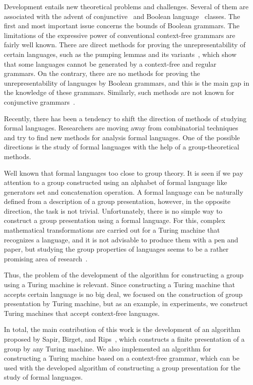 \documentclass[conference]{IEEEtran}
\theoremstyle{definition}
\begin{document}
Development entails new theoretical problems and challenges.
Several of them are associated with the advent of conjunctive~\cite{ConjGrammars} and Boolean language~\cite{BoolGrammars} classes.
The first and most important issue concerns the bounds of Boolean grammars.
The limitations of the expressive power of conventional context-free grammars are fairly well known. There are direct methods for proving the unrepresentability of certain languages,
such as the pumping lemmas and its variants~\cite{pumpingLemma}, which show that some languages
cannot be generated by a context-free and regular grammars. On the contrary, there are no methods
for proving the unrepresentability of languages by Boolean grammars, and this
is the main gap in the knowledge of these grammars. Similarly,
such methods are not known for conjunctive grammars~\cite{OKHOTIN201327}.

Recently, there has been a tendency to shift the direction of methods of studying formal languages.
Researchers are moving away from combinatorial techniques and try to find new methods for analysis formal languages.
One of the possible directions is the study of formal languages with the help of
a group-theoretical methods.

Well known that formal languages too close to group theory.
It is seen if we pay attention to a group constructed using an alphabet of
formal language like generators set and concatenation operation.
A formal language can be naturally defined from a description of a group presentation, however, in the opposite direction, the task is not trivial. Unfortunately, there is no simple way to construct a group presentation using a formal language.
For this, complex mathematical transformations are carried out for a Turing machine
that recognizes a language, and it is not advisable to produce them with a pen and paper,
but studying the group properties of languages seems to be a rather promising
area of research~\cite{Sapir, SpaceFunc}.

Thus, the problem of the development of the algorithm
for constructing a group using a Turing machine is relevant. 
Since constructing a Turing machine that accepts certain language is no big deal, we focused on the construction of group presentation by Turing machine, but as an example, in experiments, we construct Turing machines that accept context-free languages. 

In total, the main contribution of this work is the development of an algorithm proposed by Sapir, Birget, and Rips~\cite{Sapir}, which constructs a finite presentation of a group by any Turing machine. We also implemented an algorithm for constructing a Turing machine based on a context-free grammar, which can be used with the developed algorithm of constructing a group presentation for the study of formal languages.
\end{document}
